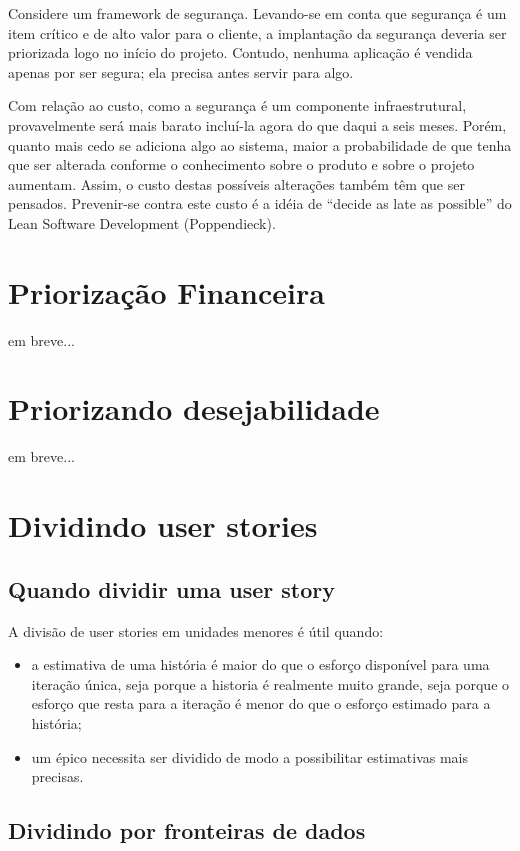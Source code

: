 \documentclass[a4paper,abntfigtabnum,noindentfirst]{abnt}
\begin{document}
Considere um framework de segurança. Levando-se em conta que segurança é um item crítico e de alto valor para o cliente, a implantação da segurança deveria ser priorizada logo no início do projeto. Contudo, nenhuma aplicação é vendida apenas por ser segura; ela precisa antes servir para algo.

Com relação ao custo, como a segurança é um componente infraestrutural, provavelmente será mais barato incluí-la agora do que daqui a seis meses. Porém, quanto mais cedo se adiciona algo ao sistema, maior a probabilidade de que tenha que ser alterada conforme o conhecimento sobre o produto e sobre o projeto aumentam. Assim, o custo destas possíveis alterações também têm que ser pensados. Prevenir-se contra este custo é a idéia de ``decide as late as possible'' do Lean Software Development (Poppendieck).


\chapter{Priorização Financeira}

em breve...


\chapter{Priorizando desejabilidade}

em breve...


\chapter{Dividindo user stories}


\section{Quando dividir uma user story}
A divisão de user stories em unidades menores é útil quando:
\begin{itemize}
\item a estimativa de uma história é maior do que o esforço disponível para uma iteração única, seja porque a historia é realmente muito grande, seja porque o esforço que resta para a iteração é menor do que o esforço estimado para a história;
\item um épico necessita ser dividido de modo a possibilitar estimativas mais precisas.

\end{itemize}


\section{Dividindo por fronteiras de dados}
\end{document}
